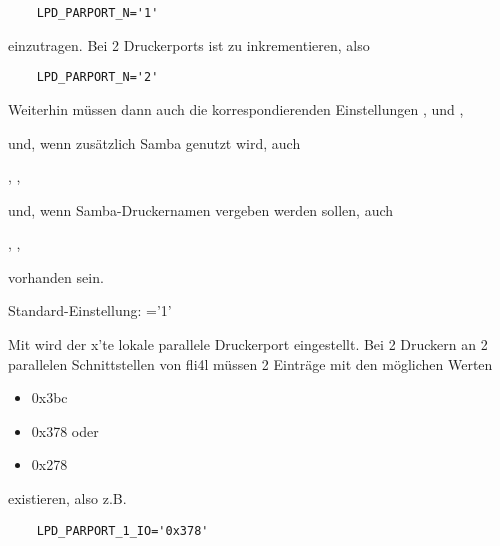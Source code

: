 \begin{description}
\begin{example}
\begin{verbatim}
    LPD_PARPORT_N='1'
\end{verbatim}
\end{example}

    einzutragen. Bei 2 Druckerports ist  zu inkrementieren,
    also

\begin{example}
\begin{verbatim}
    LPD_PARPORT_N='2'
\end{verbatim}
\end{example}

    Weiterhin müssen dann auch die korrespondierenden Einstellungen
        \emph{},
        \emph{}
        \emph{}
    und
        \emph{},
        \emph{}
        \emph{}

    und, wenn zusätzlich Samba genutzt wird, auch

        \emph{},
        \emph{},

    und, wenn Samba-Druckernamen vergeben werden sollen, auch

        \emph{},
        \emph{},

    vorhanden sein.

    Standard-Einstellung: ='1'



    Mit  wird der x'te lokale parallele Druckerport
    eingestellt.
    Bei 2 Druckern an 2 parallelen Schnittstellen von fli4l müssen 2 Einträge mit den
    möglichen Werten

\begin{itemize}
\item 0x3bc
\item 0x378 oder
\item 0x278
\end{itemize}

    existieren, also z.B.

\begin{example}
\begin{verbatim}
    LPD_PARPORT_1_IO='0x378'
\end{verbatim}
\end{example}


\end{description}
